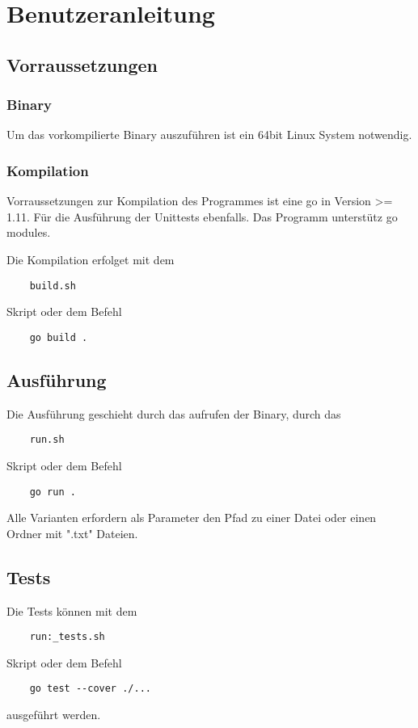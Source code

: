\chapter{Benutzeranleitung}
\label{Benutzeranleitung}

\section{Vorraussetzungen}

\subsection{Binary}
Um das vorkompilierte Binary auszuführen ist ein 64bit Linux System notwendig.

\subsection{Kompilation}
Vorraussetzungen zur Kompilation des Programmes ist eine go in Version >= 1.11.
Für die Ausführung der Unittests ebenfalls.
Das Programm unterstütz go modules.

Die Kompilation erfolget mit dem
\begin{lstlisting}
    build.sh
\end{lstlisting}  Skript oder dem Befehl
\begin{lstlisting}
    go build .
\end{lstlisting}

\section{Ausführung}

Die Ausführung geschieht durch das aufrufen der Binary, durch das
\begin{lstlisting}
    run.sh
\end{lstlisting}  Skript oder dem Befehl
\begin{lstlisting}
    go run .
\end{lstlisting}

Alle Varianten erfordern als Parameter den Pfad zu einer Datei oder einen Ordner mit ".txt" Dateien.

\section{Tests}

Die Tests können mit dem
\begin{lstlisting}
    run:_tests.sh
\end{lstlisting}  Skript oder dem Befehl
\begin{lstlisting}
    go test --cover ./...
\end{lstlisting}

ausgeführt werden.
